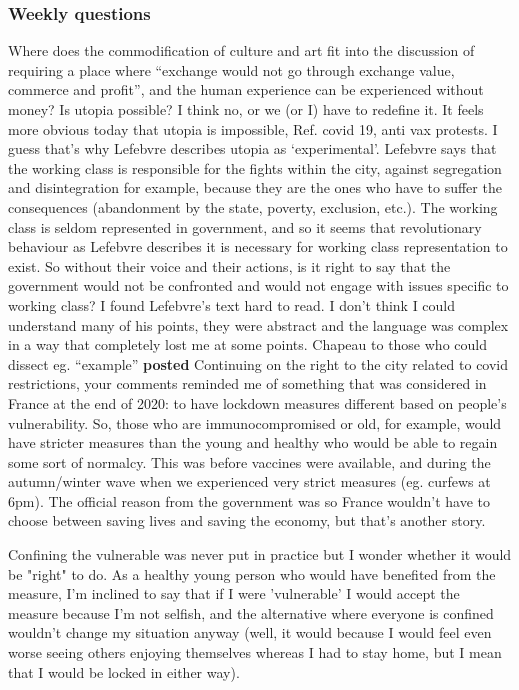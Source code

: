 \documentclass{article}
\begin{document}
\subsubsection{Weekly questions}

\begin{outline}
	\1 Where does the commodification of culture and art fit into the discussion of requiring a place where ``exchange would not go through exchange value, commerce and profit'', and the human experience can be experienced without money?
	\1 Is utopia possible? I think no, or we (or I) have to redefine it. It feels more obvious today that utopia is impossible, Ref. covid 19, anti vax protests. I guess that's why Lefebvre describes utopia as `experimental'. 
	\1 Lefebvre says that the working class is responsible for the fights within the city, against segregation and disintegration for example, because they are the ones who have to suffer the consequences (abandonment by the state, poverty, exclusion, etc.). The working class is seldom represented in government, and so it seems that revolutionary behaviour as Lefebvre describes it is necessary for working class representation to exist. So without their voice and their actions, is it right to say that the government would not be confronted and would not engage with issues specific to working class?
	\1 I found Lefebvre's text hard to read. I don't think I could understand many of his points, they were abstract and the language was complex in a way that completely lost me at some points. Chapeau to those who could dissect eg. ``example''
	\1 \textbf{posted} Continuing on the right to the city related to covid restrictions, your comments reminded me of something that was considered in France at the end of 2020: to have lockdown measures different based on people's vulnerability. So, those who are immunocompromised or old, for example, would have stricter measures than the young and healthy who would be able to regain some sort of normalcy. This was before vaccines were available, and during the autumn/winter wave when we experienced very strict measures (eg. curfews at 6pm). The official reason from the government was so France wouldn't have to choose between saving lives and saving the economy, but that's another story.
	
Confining the vulnerable was never put in practice but I wonder whether it would be "right" to do. As a healthy young person who would have benefited from the measure, I'm inclined to say that if I were 'vulnerable' I would accept the measure because I'm not selfish, and the alternative where everyone is confined wouldn't change my situation anyway (well, it would because I would feel even worse seeing others enjoying themselves whereas I had to stay home, but I mean that I would be locked in either way).


\end{outline}
\end{document}
